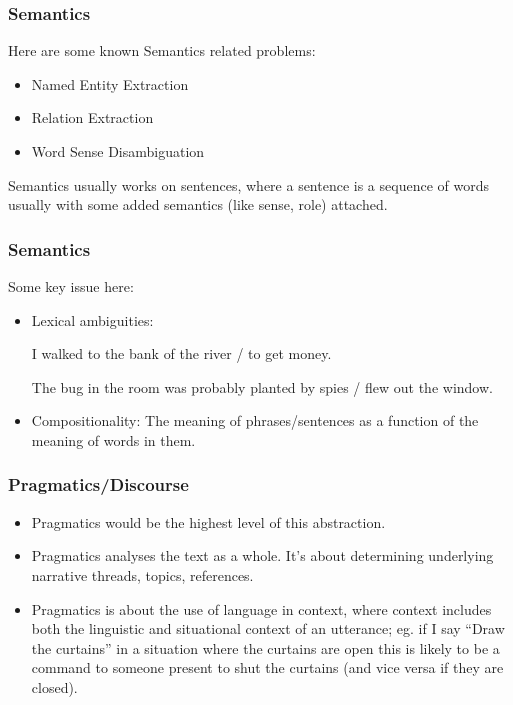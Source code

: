 \begin{frame}[fragile]
  \frametitle{Semantics}
  Here are some known Semantics related problems:
  \begin{itemize}
  \item  Named Entity Extraction
  \item  Relation Extraction
  \item  Word Sense Disambiguation
  	  \end{itemize}
Semantics usually works on sentences, where a sentence is a sequence of words usually with some added semantics (like sense, role) attached.	  
 \end{frame} 
 
\begin{frame}[fragile]
  \frametitle{Semantics}
  Some key issue here: 

  
  \begin{itemize}
  \item  Lexical ambiguities:

                  I walked to the bank      {of the river / to get money}.

                  The bug in the room   {was probably planted by spies /   
                                                        flew out the window}. 
  \item  Compositionality: The meaning of phrases/sentences as a function of the meaning of words in them.

  	  \end{itemize}
 \end{frame} 
 
\begin{frame}[fragile]
  \frametitle{Pragmatics/Discourse}
  \begin{itemize}
  \item Pragmatics would be the highest level of this abstraction.
  \item   Pragmatics analyses the text as a whole. It’s about determining underlying narrative threads, topics, references.
  \item Pragmatics is about the use of language in context, where context includes
both the linguistic and situational context of an utterance; eg. if I say ``Draw
the curtains'' in a situation where the curtains are open this is likely to be a
command to someone present to shut the curtains (and vice versa if they are
closed).
  	  \end{itemize}
 \end{frame} 
 
